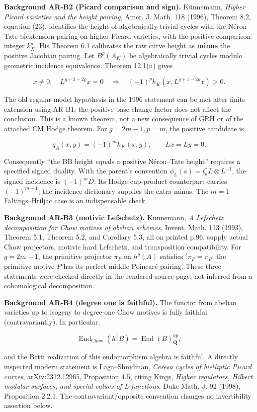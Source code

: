 \documentclass[11pt,a4paper]{article}
\begin{document}
\textbf{Background AR-B2 (Picard comparison and sign).} Künnemann,
\emph{Higher Picard varieties and the height pairing}, Amer. J. Math.
118 (1996), Theorem 8.2, equation (23), identifies the height of
algebraically trivial cycles with the Néron--Tate biextension pairing on
higher Picard varieties, with the positive comparison integer \(k_X^p\).
His Theorem 6.1 calibrates the raw curve height as \textbf{minus} the
positive Jacobian pairing. Let \(B^p(A_K)\) be algebraically trivial
cycles modulo geometric incidence equivalence. Theorem 12.1(ii) gives

\[
 x\ne0,\quad L^{g+2-2p}x=0
 \quad\Longrightarrow\quad
 (-1)^p h_K(x,L^{g+1-2p}x)>0.
\]

The old regular-model hypothesis in the 1996 statement can be met after
finite extension using AR-B1; the positive base-change factor does not
affect the conclusion. This is a known theorem, not a new consequence of
GRH or of the attached CM Hodge theorem. For \(g=2m-1,p=m\), the
positive candidate is

\[
q_A(x,y)=(-1)^m h_K(x,y),\qquad Lx=Ly=0.
\tag{AR.1}
\]

Consequently ``the BB height equals a positive Néron--Tate height''
requires a specified signed duality. With the parent's convention
\(\phi_L(a)=t_a^*L\otimes L^{-1}\), the signed incidence is
\((-1)^m D\). Its Hodge cup-product counterpart carries \((-1)^{m-1}\);
the incidence dictionary supplies the extra minus. The \(m=1\)
Faltings--Hriljac case is an indispensable check.

\textbf{Background AR-B3 (motivic Lefschetz).} Künnemann, \emph{A
Lefschetz decomposition for Chow motives of abelian schemes}, Invent.
Math. 113 (1993), Theorem 5.1, Theorem 5.2, and Corollary 5.3, all on
printed p.96, supply actual Chow projectors, motivic hard Lefschetz, and
transposition compatibility. For \(g=2m-1\), the primitive projector
\(\pi_P\) on \(h^g(A)\) satisfies \({}^t\pi_P=\pi_P\); the primitive
motive \(P\) has its perfect middle Poincaré pairing. These three
statements were checked directly in the rendered source page, not
inferred from a cohomological decomposition.

\textbf{Background AR-B4 (degree one is faithful).} The functor from
abelian varieties up to isogeny to degree-one Chow motives is fully
faithful (contravariantly). In particular,

\[
\operatorname{End}_{\mathrm{Chow}}(h^1B)=\operatorname{End}(B)_{\mathbf Q}^{\mathrm{op}},
\]

and the Betti realization of this endomorphism algebra is faithful. A
directly inspected modern statement is Laga--Shnidman, \emph{Ceresa
cycles of bielliptic Picard curves}, arXiv:2312.12965, Proposition 4.5,
citing Kings, \emph{Higher regulators, Hilbert modular surfaces, and
special values of L-functions}, Duke Math. J. 92 (1998), Proposition
2.2.1. The contravariant/opposite convention changes no invertibility
assertion below.
\end{document}

